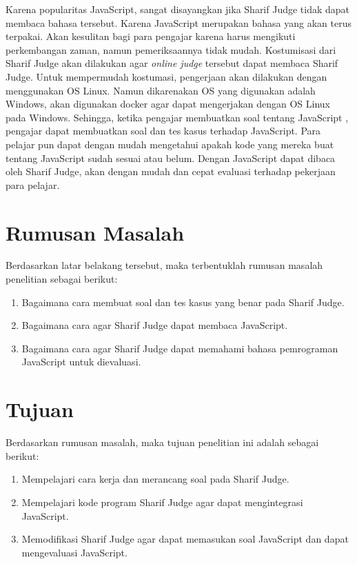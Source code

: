 \documentclass[a4paper,twoside]{article}
\begin{document}
Karena popularitas JavaScript, sangat disayangkan jika Sharif Judge tidak dapat membaca bahasa tersebut. Karena JavaScript merupakan bahasa yang akan terus terpakai. Akan kesulitan bagi para pengajar karena harus mengikuti perkembangan zaman, namun pemeriksaannya tidak mudah. Kostumisasi dari Sharif Judge akan dilakukan agar \textit{online judge} tersebut dapat membaca Sharif Judge. Untuk mempermudah kostumasi, pengerjaan akan dilakukan dengan menggunakan OS Linux. Namun dikarenakan OS yang digunakan adalah Windows, akan digunakan docker agar dapat mengerjakan dengan OS Linux pada Windows. Sehingga, ketika pengajar membuatkan soal tentang JavaScript , pengajar dapat membuatkan soal dan tes kasus terhadap JavaScript. Para pelajar pun dapat dengan mudah mengetahui apakah kode yang mereka buat tentang JavaScript sudah sesuai atau belum. Dengan JavaScript dapat dibaca oleh Sharif Judge, akan dengan mudah dan cepat evaluasi terhadap pekerjaan para pelajar.


\section{Rumusan Masalah}
\label{sec:rumusan}
Berdasarkan latar belakang tersebut, maka terbentuklah rumusan masalah penelitian sebagai berikut: 
\begin{enumerate}
    \item Bagaimana cara membuat soal dan tes kasus yang benar pada Sharif Judge.
    \item Bagaimana cara agar Sharif Judge dapat membaca JavaScript.
    \item Bagaimana cara agar Sharif Judge dapat memahami bahasa pemrograman JavaScript untuk dievaluasi.
\end{enumerate}

\section{Tujuan}
\label{sec:tujuan}
Berdasarkan rumusan masalah, maka tujuan penelitian ini adalah sebagai berikut:
\begin{enumerate}
    \item Mempelajari cara kerja dan merancang soal pada Sharif Judge.
    \item Mempelajari kode program Sharif Judge agar dapat mengintegrasi JavaScript.
    \item Memodifikasi Sharif Judge agar dapat memasukan soal JavaScript dan dapat mengevaluasi JavaScript.
\end{enumerate}
\end{document}
